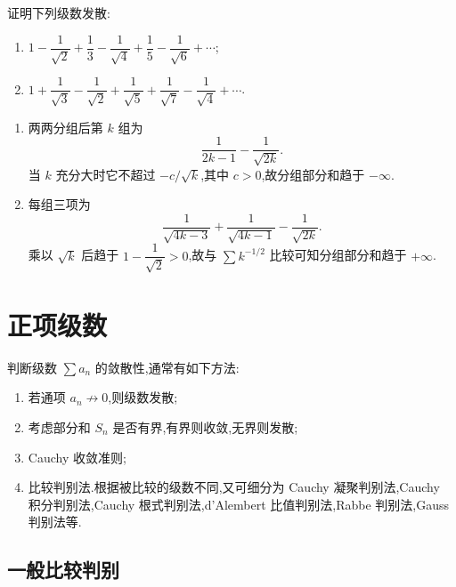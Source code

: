 \begin{example}
    证明下列级数发散:
    \begin{enumerate}
        \item $\displaystyle1-\dfrac{1}{\sqrt2}+\dfrac{1}{3}-\dfrac{1}{\sqrt4}+\dfrac{1}{5}-\dfrac{1}{\sqrt6}+\cdots$;
        \item $\displaystyle1+\dfrac{1}{\sqrt3}-\dfrac{1}{\sqrt2}+\dfrac{1}{\sqrt5}+\dfrac{1}{\sqrt7}-\dfrac{1}{\sqrt4}+\cdots$.
    \end{enumerate}
\end{example}
\exampleblank

\begin{solution}
    \leavevmode
    \begin{enumerate}
        \item 两两分组后第 $k$ 组为
              \[
                  \dfrac{1}{2k-1}-\dfrac{1}{\sqrt{2k}}.
              \]
              当 $k$ 充分大时它不超过 $-c/\sqrt k$,其中 $c>0$,故分组部分和趋于 $-\infty$.
        \item 每组三项为
              \[
                  \dfrac{1}{\sqrt{4k-3}}+\dfrac{1}{\sqrt{4k-1}}-\dfrac{1}{\sqrt{2k}}.
              \]
              乘以 $\sqrt k$ 后趋于 $1-\dfrac{1}{\sqrt2}>0$,故与 $\displaystyle \sum\limits k^{-1/2}$ 比较可知分组部分和趋于 $+\infty$.
    \end{enumerate}
\end{solution}


\newpage

\section{正项级数}

判断级数 $\displaystyle\sum a_n$ 的敛散性,通常有如下方法:
\begin{enumerate}
    \item 若通项 $a_n\not\to0$,则级数发散;
    \item 考虑部分和 $S_n$ 是否有界,有界则收敛,无界则发散;
    \item Cauchy 收敛准则;
    \item 比较判别法.根据被比较的级数不同,又可细分为 Cauchy 凝聚判别法,Cauchy 积分判别法,Cauchy 根式判别法,d'Alembert 比值判别法,Rabbe 判别法,Gauss 判别法等.
\end{enumerate}



\subsection{一般比较判别}


